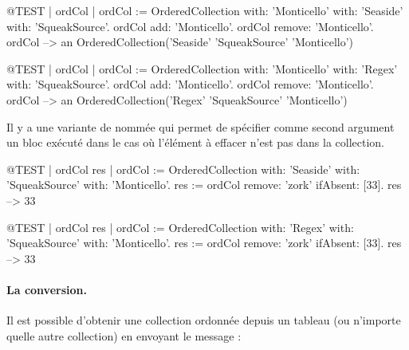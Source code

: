 \documentclass[a4paper,10pt,twoside]{book}
\begin{document}
\if\value{seaside-chapter}
\begin{code}{@TEST | ordCol | ordCol := OrderedCollection with: 'Monticello' with: 'Seaside' with: 'SqueakSource'.}
ordCol add: 'Monticello'.
ordCol remove: 'Monticello'.
ordCol --> an OrderedCollection('Seaside' 'SqueakSource' 'Monticello')
\end{code}
\else
\begin{code}{@TEST | ordCol | ordCol := OrderedCollection with: 'Monticello' with: 'Regex' with: 'SqueakSource'.}
ordCol add: 'Monticello'.
ordCol remove: 'Monticello'.
ordCol --> an OrderedCollection('Regex' 'SqueakSource' 'Monticello')
\end{code}
\fi

Il y a une variante de  nommée  qui permet de spécifier comme second argument un bloc exécuté dans le cas où l'élément à effacer n'est pas dans la collection. 

\if\value{seaside-chapter}
\begin{code}{@TEST | ordCol res | ordCol := OrderedCollection with: 'Seaside' with: 'SqueakSource' with: 'Monticello'.}
res := ordCol remove: 'zork' ifAbsent: [33].
res --> 33
\end{code}
\else
\begin{code}{@TEST | ordCol res | ordCol := OrderedCollection with: 'Regex' with: 'SqueakSource' with: 'Monticello'.}
res := ordCol remove: 'zork' ifAbsent: [33].
res --> 33
\end{code}
\fi

\paragraph{La conversion.}
Il est possible d'obtenir une collection ordonnée  depuis
un tableau  (ou n'importe quelle autre collection) en envoyant le message :


\end{document}
